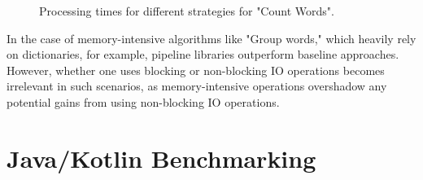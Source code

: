 
\begin{figure}[H]
    \raggedright
    \caption{Processing times for different strategies for "Count Words".}
    \label{fig:group_word_processing_times_cs}
\end{figure}

In the case of memory-intensive algorithms like "Group words," which heavily rely on dictionaries, for example, pipeline libraries outperform baseline approaches. However, whether one uses blocking or non-blocking IO operations becomes irrelevant in such scenarios, as memory-intensive operations overshadow any potential gains from using non-blocking IO operations.

\clearpage

\section{Java/Kotlin Benchmarking}
\label{sec:java_implementation}

